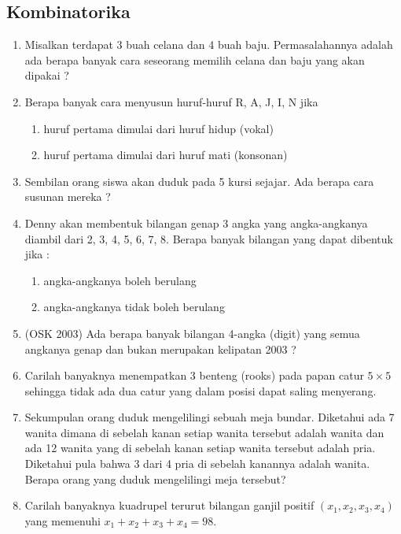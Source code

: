 \subsection{Kombinatorika}
\begin{enumerate}
    \item Misalkan terdapat 3 buah celana dan 4 buah baju. Permasalahannya adalah ada berapa banyak cara 
seseorang memilih celana dan baju yang akan dipakai ?

    \item Berapa banyak cara menyusun huruf-huruf R, A, J, I, N jika 
\begin{enumerate}
    \item huruf pertama dimulai dari huruf hidup (vokal) 
    \item huruf pertama dimulai dari huruf mati (konsonan) 
\end{enumerate}

    \item Sembilan orang siswa akan duduk pada 5 kursi sejajar. Ada berapa cara susunan mereka ? 
    
    \item Denny akan membentuk bilangan genap 3 angka yang angka-angkanya diambil dari 2, 3, 4, 5, 6, 7, 8. 
Berapa banyak bilangan yang dapat dibentuk jika : 
    \begin{enumerate}
        \item angka-angkanya boleh berulang 
\item angka-angkanya tidak boleh berulang
    \end{enumerate}
    
    \item (OSK 2003) Ada berapa banyak bilangan 4-angka (digit) yang semua angkanya genap dan bukan 
merupakan kelipatan 2003 ?
    \item  Carilah banyaknya menempatkan 3 benteng (rooks) pada papan catur $5 \times 5$ sehingga
tidak ada dua catur yang dalam posisi dapat saling menyerang.

    \item Sekumpulan orang duduk mengelilingi sebuah meja bundar. Diketahui ada 7 wanita
dimana di sebelah kanan setiap wanita tersebut adalah wanita dan ada 12 wanita yang di
sebelah kanan setiap wanita tersebut adalah pria. Diketahui pula bahwa 3 dari 4 pria di
sebelah kanannya adalah wanita. Berapa orang yang duduk mengelilingi meja tersebut?

    \item Carilah banyaknya kuadrupel terurut bilangan ganjil positif $(x_1, x_2, x_3, x_4)$ yang memenuhi
$x_1 + x_2 + x_3 + x_4 = 98$.


\end{enumerate}
